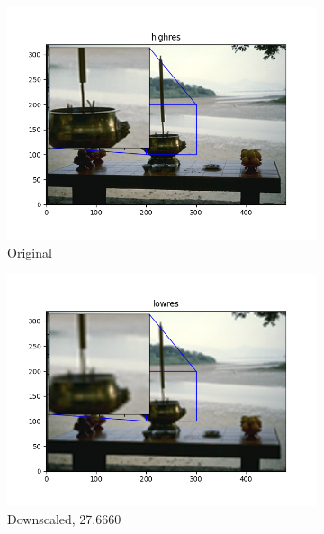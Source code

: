 \documentclass[12pt]{article}
\begin{document}
\begin{figure}[h!]
  \begin{subfigure}[b]{0.32\linewidth}
    \includegraphics[width=\linewidth]{./8-highres.png}
    \caption{Original}
  \end{subfigure}
  \hfill
  \begin{subfigure}[b]{0.32\linewidth}
    \includegraphics[width=\linewidth]{./8-lowres.png}
    \caption{Downscaled, 27.6660}
  \end{subfigure}
  \hfill
  \begin{subfigure}[b]{0.32\linewidth}

\end{subfigure}
\end{figure}
\end{document}
